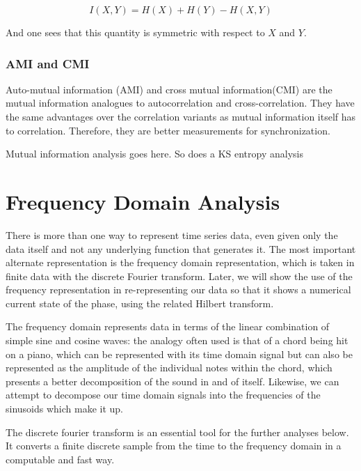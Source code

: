 \documentclass[12pt]{article}
\begin{document}
$$I(X, Y) = H(X) + H(Y) - H(X, Y)$$

And one sees that this quantity is symmetric with respect to $X$ and $Y$.

\subsubsection{AMI and CMI}

Auto-mutual information (AMI) and cross mutual information(CMI) are the mutual information analogues to autocorrelation and cross-correlation. They have the same advantages over the correlation variants as mutual information itself has to correlation. Therefore, they are better measurements for synchronization.

Mutual information analysis goes here. So does a KS entropy analysis


\section{Frequency Domain Analysis}

There is more than one way to represent time series data, even given only the data itself and not any underlying function that generates it. The most important alternate representation is the frequency domain representation, which is taken in finite data with the discrete Fourier transform. Later, we will show the use of the frequency representation in re-representing our data so that it shows a numerical current state of the phase, using the related Hilbert transform.

The frequency domain represents data in terms of the linear combination of simple sine and cosine waves: the analogy often used is that of a chord being hit on a piano, which can be represented with its time domain signal but can also be represented as the amplitude of the individual notes within the chord, which presents a better decomposition of the sound in and of itself. Likewise, we can attempt to decompose our time domain signals into the frequencies of the sinusoids which make it up.

The discrete fourier transform is an essential tool for the further analyses below. It converts a finite discrete sample from the time to the frequency domain in a computable and fast way.

\end{document}
